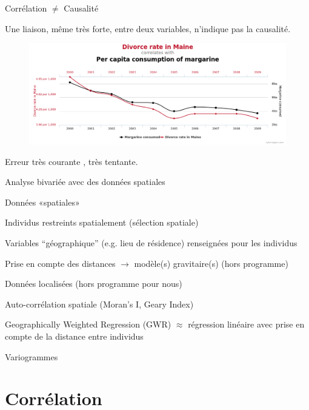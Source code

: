 \documentclass{beamer}
\begin{document}
\begin{frame}{Corrélation $\neq$ Causalité }




 Une liaison, même très forte, entre deux variables, n’indique pas la causalité. 

\begin{figure}
  \centering
     \includegraphics[width=.9\linewidth]{img/spurious.png}
\end{figure}

Erreur très courante , très tentante. 

\end{frame}


\begin{frame} {Analyse bivariée avec des données spatiales}


\begin{block}{\alert{Données «spatiales»}}

Individus restreints spatialement (sélection spatiale)


Variables “géographique” (e.g. lieu de résidence) renseignées pour les individus

Prise en compte des distances $\rightarrow$ modèle(s) gravitaire(s) (hors programme)
\end{block}

\vspace{1cm}

\begin{block}{Données localisées (hors programme pour nous)}

    Auto-corrélation spatiale (Moran’s I, Geary Index)

    Geographically Weighted Regression (GWR) $\approx$ régression linéaire avec prise en compte de la distance entre individus

    Variogrammes 
\end{block}

\end{frame}



\section{Corrélation}
\end{document}
